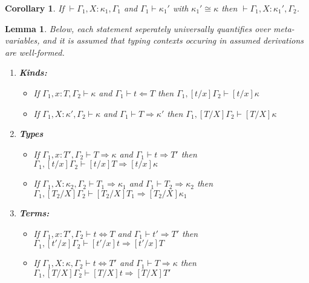 \documentclass{article}
\newcommand{\tpcheck}[0]{\Leftarrow}
\newcommand{\tpsynth}[0]{\Rightarrow}
\newtheorem{lemma}[theorem]{Lemma}
\newtheorem{corollary}[theorem]{Corollary}
\begin{document}
\begin{corollary}
  \label{cor:ctxt-conv-class}
  If \(\vdash \Gamma_1,X:\kappa_1,\Gamma_1\) and \(\Gamma_1 \vdash \kappa_1'\)
  with \(\kappa_1' \cong \kappa\) then \(\vdash \Gamma_1,X:\kappa_1',\Gamma_2\).
\end{corollary}

\begin{lemma}
  \label{lem:subst-class}
  Below, each statement seperately universally quantifies over meta-variables,
  and it is assumed that typing contexts occuring in assumed derivations are
  well-formed.
  \begin{enumerate}
  \item \textbf{Kinds:}
    \begin{itemize}
    \item If \(\Gamma_1,x:T,\Gamma_2 \vdash \kappa\) and \(\Gamma_1 \vdash t
      \tpcheck T\) then \(\Gamma_1,[t/x]\Gamma_2 \vdash [t/x] \kappa\)
      
    \item If \(\Gamma_1,X:\kappa',\Gamma_2 \vdash \kappa\) and \(\Gamma_1 \vdash
      T \tpsynth \kappa'\) then \(\Gamma_1,[T/X]\Gamma_2 \vdash [T/X]\kappa\)
    \end{itemize}
    
  \item \textbf{Types}
    \begin{itemize}
    \item If \(\Gamma_1,x:T',\Gamma_2 \vdash T \tpsynth \kappa\) and \(\Gamma_1 \vdash t
      \tpsynth T'\) then \(\Gamma_1,[t/x]\Gamma_2 \vdash [t/x]T \tpsynth [t/x]\kappa\)
      
    \item If \(\Gamma_1,X:\kappa_2,\Gamma_2 \vdash T_1 \tpsynth \kappa_1\) and \(\Gamma_1
      \vdash T_2 \tpsynth \kappa_2\) then \(\Gamma_1,[T_2/X]\Gamma_2 \vdash [T_2/X]T_1 \tpsynth [T_2/X]\kappa_1\)
    \end{itemize}
    
  \item \textbf{Terms:}
    \begin{itemize}
    \item If \(\Gamma_1,x:T',\Gamma_2 \vdash t \Leftrightarrow T\) and
      \(\Gamma_1 \vdash t' \tpsynth T'\) then \(\Gamma_1,[t'/x]\Gamma_2 \vdash [t'/x]t
      \tpsynth [t'/x]T\)
     
    \item If \(\Gamma_1,X:\kappa,\Gamma_2 \vdash t \Leftrightarrow T'\) and
      \(\Gamma_1 \vdash T \tpsynth \kappa\) then \(\Gamma_1,[T/X]\Gamma_2 \vdash
      [T/X]t \tpsynth [T/X]T'\)
    \end{itemize}
  \end{enumerate}
\end{lemma}
\end{document}
